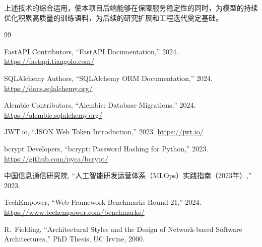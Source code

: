 \documentclass[12pt,a4paper]{ctexart}
\begin{document}
上述技术的综合运用，使本项目后端能够在保障服务稳定性的同时，为模型的持续优化积累高质量的训练语料，为后续的研究扩展和工程迭代奠定基础。

\begin{thebibliography}{99}

FastAPI Contributors, ``FastAPI Documentation,'' 2024. \url{https://fastapi.tiangolo.com/}

SQLAlchemy Authors, ``SQLAlchemy ORM Documentation,'' 2024. \url{https://docs.sqlalchemy.org/}

Alembic Contributors, ``Alembic: Database Migrations,'' 2024. \url{https://alembic.sqlalchemy.org/}

JWT.io, ``JSON Web Token Introduction,'' 2023. \url{https://jwt.io/}

bcrypt Developers, ``bcrypt: Password Hashing for Python,'' 2023. \url{https://github.com/pyca/bcrypt/}

中国信息通信研究院, ``人工智能研发运营体系（MLOps）实践指南（2023年）,'' 2023.

TechEmpower, ``Web Framework Benchmarks Round 21,'' 2024. \url{https://www.techempower.com/benchmarks/}

R.~Fielding, ``Architectural Styles and the Design of Network-based Software Architectures,'' PhD Thesis, UC Irvine, 2000.

\end{thebibliography}
\end{document}
